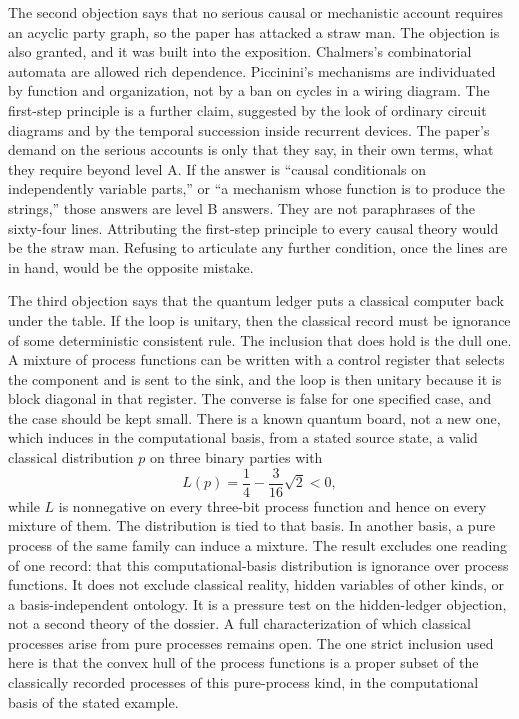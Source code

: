 \documentclass[11pt]{article}
\begin{document}
The second objection says that no serious causal or mechanistic account requires an acyclic party graph, so the paper has attacked a straw man. The objection is also granted, and it was built into the exposition. Chalmers’s combinatorial automata are allowed rich dependence. Piccinini’s mechanisms are individuated by function and organization, not by a ban on cycles in a wiring diagram. The first-step principle is a further claim, suggested by the look of ordinary circuit diagrams and by the temporal succession inside recurrent devices. The paper’s demand on the serious accounts is only that they say, in their own terms, what they require beyond level A. If the answer is ``causal conditionals on independently variable parts,'' or ``a mechanism whose function is to produce the strings,'' those answers are level B answers. They are not paraphrases of the sixty-four lines. Attributing the first-step principle to every causal theory would be the straw man. Refusing to articulate any further condition, once the lines are in hand, would be the opposite mistake.

The third objection says that the quantum ledger puts a classical computer back under the table. If the loop is unitary, then the classical record must be ignorance of some deterministic consistent rule. The inclusion that does hold is the dull one. A mixture of process functions can be written with a control register that selects the component and is sent to the sink, and the loop is then unitary because it is block diagonal in that register. The converse is false for one specified case, and the case should be kept small. There is a known quantum board, not a new one, which induces in the computational basis, from a stated source state, a valid classical distribution \(p\) on three binary parties with
\[
L(p) = \frac14 - \frac{3}{16}\sqrt{2} < 0,
\]
while \(L\) is nonnegative on every three-bit process function and hence on every mixture of them. The distribution is tied to that basis. In another basis, a pure process of the same family can induce a mixture. The result excludes one reading of one record: that this computational-basis distribution is ignorance over process functions. It does not exclude classical reality, hidden variables of other kinds, or a basis-independent ontology. It is a pressure test on the hidden-ledger objection, not a second theory of the dossier. A full characterization of which classical processes arise from pure processes remains open. The one strict inclusion used here is that the convex hull of the process functions is a proper subset of the classically recorded processes of this pure-process kind, in the computational basis of the stated example.
\end{document}
